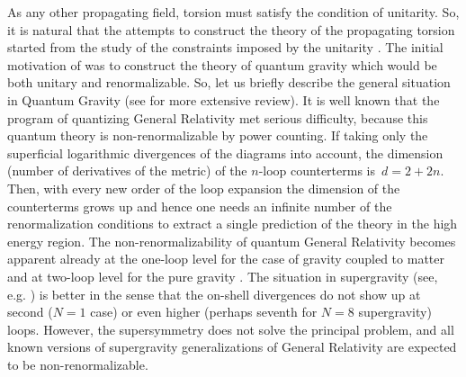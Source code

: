 As any other propagating field, torsion must satisfy the condition of 
unitarity. So, it is natural that the attempts to construct the theory
of the propagating torsion started from the study of the constraints 
imposed by the unitarity \cite{nev1,nev2,seznie,sez,nev3}. 
The initial motivation of  \cite{nev1,nev2,seznie,sez} was to construct 
the theory of quantum gravity which would be both unitary and 
renormalizable. So, let us briefly describe the general situation in 
Quantum Gravity (see \cite{susy-enc} for more extensive review). 
It is well known that the program of quantizing General Relativity
met serious difficulty, because this quantum theory is non-renormalizable 
by power counting. If taking only the superficial  logarithmic 
divergences of the diagrams into account, the
dimension (number of derivatives of the metric) of the $n$-loop
counterterms is $\,d = 2+2n$. Then, 
with every new order of the loop expansion the dimension of the
counterterms grows up and hence one needs an infinite number 
of the renormalization conditions to extract a single prediction of 
the theory in the high energy region. The non-renormalizability of 
quantum General Relativity becomes apparent already at the one-loop
level for the case of gravity coupled to matter \cite{hove,dene}
and at two-loop level for the pure gravity \cite{2loop}. The
situation in supergravity (see, e.g. \cite{super})
is better in the sense that the on-shell divergences do not 
show up at second ($N=1$ case) or even higher (perhaps seventh 
for $N=8$ supergravity) loops. However, the supersymmetry does not
solve the principal problem, and all known versions of  
supergravity generalizations of General Relativity are expected to
be non-renormalizable. 


